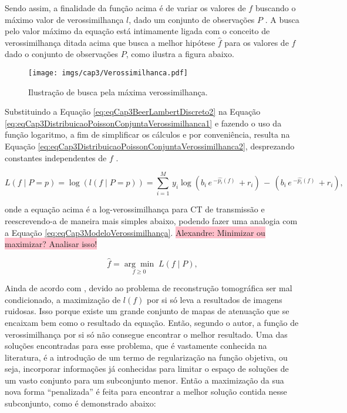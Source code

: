 {{Sendo assim, a finalidade da função acima é de variar os valores de $f$ buscando o máximo valor de verossimilhança $l$, dado um conjunto de observações $P$ \cite[p. 231]{buzug2008computed}. A busca pelo valor máximo da equação está intimamente ligada com o conceito de verossimilhança ditada acima que busca a melhor hipótese $\hat{f}$ para os valores de $f$ dado o conjunto de observações $P$, como ilustra a figura abaixo. 


\begin{figure}[H]
	\caption{Ilustração de busca pela máxima verossimilhança.}
	\begin{center}
		\texttt{[image: imgs/cap3/Verossimilhanca.pdf]}
	\end{center}
	\label{fig:imgCap3Verossimilhanca}
\end{figure}   

Substituindo a Equação \ref{eq:eqCap3BeerLambertDiscreto2} na Equação \ref{eq:eqCap3DistribuicaoPoissonConjuntaVerossimilhanca1} e fazendo o uso da função logaritmo, a fim de simplificar os cálculos e por conveniência, resulta na Equação \ref{eq:eqCap3DistribuicaoPoissonConjuntaVerossimilhanca2}, desprezando constantes independentes de $f$ \cite[p. 10]{Fessler2000handbook}. 

\begin{equation}
L(f \mid P = p) = \log (l(f \mid P = p)) = \sum_{i=1}^{M} \, y_{i} \log (b_{i} \, e \, ^{-\hat{p_{i}}(f)} \, + r_{i}) \,-\,(b_{i} \, e \, ^{-\hat{p_{i}}(f)} \, + r_{i}),
\label{eq:eqCap3DistribuicaoPoissonConjuntaVerossimilhanca2}
\end{equation} 

\noindent onde a equação acima é a log-verossimilhança para \acs{CT} de transmissão e reescrevendo-a de maneira mais simples abaixo, podendo fazer uma analogia com a Equação \ref{eq:eqCap3ModeloVerossimilhança}. \colorbox{pink}{Alexandre: Minimizar ou maximizar? Analisar isso!}

\begin{equation}
\hat{f} = \underset{f\geq 0}{\arg\min} \; L(f \mid P),
\label{eq:eqCap3VerossimilhançaFinal}
\end{equation}

Ainda de acordo com , devido ao problema de reconstrução tomográfica ser mal condicionado, a maximização de $l(f)$ por si só leva a resultados de imagens ruidosas. Isso porque existe um grande conjunto de mapas de atenuação que se encaixam bem como o resultado da equação. Então, segundo o autor, a função de verossimilhança por si só não consegue encontrar o melhor resultado. Uma das soluções encontradas para esse problema, que é vastamente conhecida na literatura, é a introdução de um termo de regularização na função objetiva, ou seja, incorporar informações já conhecidas para limitar o espaço de soluções de um vasto conjunto para um subconjunto menor. Então a maximização da sua nova forma ``penalizada'' é feita para encontrar a melhor solução contida nesse subconjunto, como é demonstrado abaixo:     

}}
